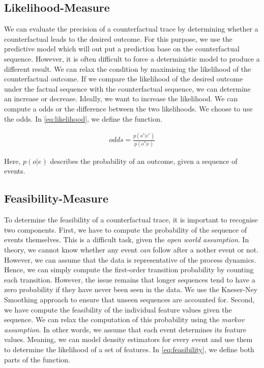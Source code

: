 \documentclass[./../../paper.tex]{subfiles}
\begin{document}
\subsection{Likelihood-Measure}
We can evaluate the precision of a counterfactual trace by determining whether a counterfactual leads to the desired outcome. For this purpose, we use the predictive model which will out put a prediction base on the counterfactual sequence. However, it is often difficult to force a deterministic model to produce a different result. We can relax the condition by maximising the likelihood of the counterfactual outcome. If we compare the likelihood of the desired outcome under the factual sequence with the counterfactual sequence, we can determine an increase or decrease. Ideally, we want to increase the likelihood. We can compute a odds or the difference between the two likelihoods. We choose to use the odds. In \autoref{eq:likelihood}, we define the function.

\begin{align}
    \label{eq:likelihood}
    odds = \frac{p(o^*|e^*)}{p(o^*|e)}
\end{align}

Here, $p(o|e)$ describes the probability of an outcome, given a sequence of events.

\subsection{Feasibility-Measure}
To determine the feasibility of a counterfactual trace, it is important to recognise two components. First, we have to compute the probability of the sequence of events themselves. This is a difficult task, given the \emph{open world assumption}. In theory, we cannot know whether any event \emph{can} follow after a nother event or not. However, we can assume that the data is representative of the process dynamics. Hence, we can simply compute the first-order transition probability by counting each transition. However, the issue remains that longer sequences tend to have a zero probability if they have never been seen in the data. We use the Kneser-Ney Smoothing\needscite{} approach to ensure that unseen sequences are accounted for. Second, we have compute the feasibility of the individual feature values given the sequence. We can relax the computation of this probability using the \emph{markov assumption}. In other words, we assume that each event determines its feature values. Meaning, we can model density estimators for every event and use them to determine the likelihood of a set of features. In \autoref{eq:feasibility}, we define both parts of the function.
\end{document}
